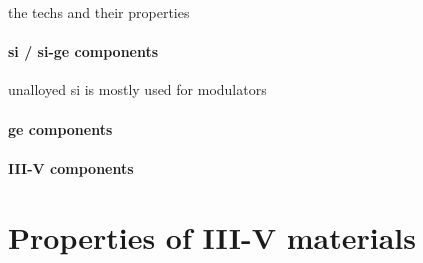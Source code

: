 the techs and their properties

\paragraph{\Acl{si} / \acl{si}-\acl{ge} components} unalloyed \acl{si} is mostly used for modulators
\par
\paragraph{\Acl{ge} components}
\par
\paragraph{III-V components}
\par











\section{Properties of III-V materials}

